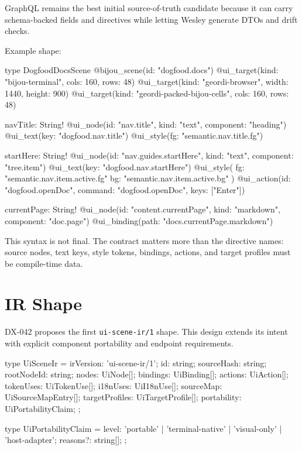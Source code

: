 GraphQL remains the best initial source-of-truth candidate because it can carry schema-backed fields and directives while letting Wesley generate DTOs and drift checks.

Example shape:

\begin{CodeBlock}
type DogfoodDocsScene
  @bijou_scene(id: "dogfood.docs")
  @ui_target(kind: "bijou-terminal", cols: 160, rows: 48)
  @ui_target(kind: "geordi-browser", width: 1440, height: 900)
  @ui_target(kind: "geordi-packed-bijou-cells", cols: 160, rows: 48) {
  navTitle: String!
    @ui_node(id: "nav.title", kind: "text", component: "heading")
    @ui_text(key: "dogfood.nav.title")
    @ui_style(fg: "semantic.nav.title.fg")

  startHere: String!
    @ui_node(id: "nav.guides.startHere", kind: "text", component: "tree.item")
    @ui_text(key: "dogfood.nav.startHere")
    @ui_style(
      fg: "semantic.nav.item.active.fg"
      bg: "semantic.nav.item.active.bg"
    )
    @ui_action(id: "dogfood.openDoc", command: "dogfood.openDoc", keys: ["Enter"])

  currentPage: String!
    @ui_node(id: "content.currentPage", kind: "markdown", component: "doc.page")
    @ui_binding(path: "docs.currentPage.markdown")
}
\end{CodeBlock}

This syntax is not final. The contract matters more than the directive names: source nodes, text keys, style tokens, bindings, actions, and target profiles must be compile-time data.

\section{IR Shape}\label{record-139-ir-shape}

DX-042 proposes the first \texttt{u\allowbreak{}i\allowbreak{}-\allowbreak{}s\allowbreak{}c\allowbreak{}e\allowbreak{}n\allowbreak{}e\allowbreak{}-\allowbreak{}i\allowbreak{}r\allowbreak{}/\allowbreak{}1} shape. This design extends its intent with explicit component portability and endpoint requirements.

\begin{CodeBlock}
type UiSceneIr = {
  irVersion: 'ui-scene-ir/1';
  id: string;
  sourceHash: string;
  rootNodeId: string;
  nodes: UiNode[];
  bindings: UiBinding[];
  actions: UiAction[];
  tokenUses: UiTokenUse[];
  i18nUses: UiI18nUse[];
  sourceMap: UiSourceMapEntry[];
  targetProfiles: UiTargetProfile[];
  portability: UiPortabilityClaim;
};

type UiPortabilityClaim = {
  level: 'portable' | 'terminal-native' | 'visual-only' | 'host-adapter';
  reasons?: string[];
};
\end{CodeBlock}

